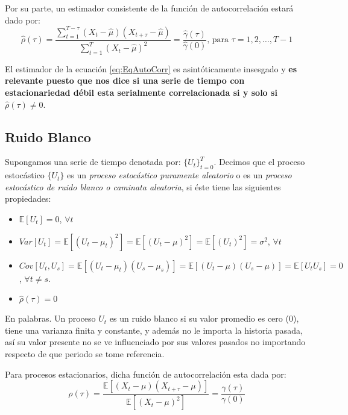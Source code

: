 \documentclass[
]{book}
\begin{document}
Por su parte, un estimador consistente de la función de autocorrelación estará dado por:
\begin{equation}
    \hat{\rho}(\tau) = \frac{\sum^{T - \tau}_{t=1} (X_t - \hat{\mu})(X_{t+\tau} - \hat{\mu})}{\sum^T_{t=1} (X_t - \hat{\mu})^2} = \frac{\hat{\gamma}(\tau)}{\hat{\gamma}(0)} \mbox{, para } \tau = 1, 2, \ldots, T-1
    \label{eq:EqAutoCorr}
\end{equation}

El estimador de la ecuación \eqref{eq:EqAutoCorr} es asintóticamente insesgado y \textbf{es relevante puesto que nos dice si una serie de tiempo con estacionariedad débil esta serialmente correlacionada si y solo si \(\hat{\rho}(\tau)\neq0\)}.

\hypertarget{ruido-blanco}{%
\subsection{Ruido Blanco}\label{ruido-blanco}}

Supongamos una serie de tiempo denotada por: \(\{U_t\}^T_{t = 0}\). Decimos que el proceso estocástico \(\{U_t\}\) es un \emph{proceso estocástico puramente aleatorio} o es un \emph{proceso estocástico de ruido blanco o caminata aleatoria}, si éste tiene las siguientes propiedades:

\begin{itemize}
\item
  \(\mathbb{E}[U_t] = 0\), \(\forall t\)
\item
  \(Var[U_t] = \mathbb{E}[(U_t - \mu_t)^2] = \mathbb{E}[(U_t - \mu)^2] = \mathbb{E}[(U_t)^2] = \sigma^2\), \(\forall t\)
\item
  \(Cov[U_t,U_s] = \mathbb{E}[(U_t - \mu_t)(U_s - \mu_s)] = \mathbb{E}[(U_t - \mu)(U_s - \mu)] = \mathbb{E}[U_t U_s] = 0\), \(\forall t \neq s\).
\item
  \(\hat{\rho}(\tau)=0\)
\end{itemize}

En palabras. Un proceso \(U_t\) es un ruido blanco si su valor promedio es cero (0), tiene una varianza finita y constante, y además no le importa la historia pasada, así su valor presente no se ve influenciado por sus valores pasados no importando respecto de que periodo se tome referencia.

Para procesos estacionarios, dicha función de autocorrelación esta dada por:
\begin{equation}
    \rho(\tau) = \frac{\mathbb{E}[(X_t - \mu)(X_{t+\tau} - \mu)]}{\mathbb{E}[(X_t - \mu)^2]} = \frac{\gamma(\tau)}{\gamma(0)} 
\end{equation}
\end{document}
